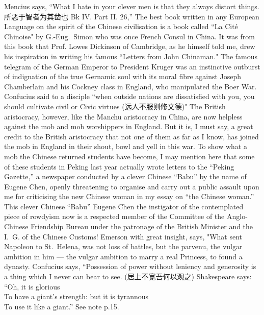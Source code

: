 
\begin{thebibliography}{30}
     Mencius says, ``What I hate in your clever men is that they always distort things. 所恶于智者为其凿也 Bk IV. Part II. 26,''
     The best book written in any European Language on the spirit of the Chinese civilisation is a book called ``La Cit\'e Chinoise" by G.-Eug.~Simon who was once French Consul in China. It was from this book that Prof. Lowes Dickinson of Cambridge, as he himself told me, drew his inspiration in writing his famous ``Letters from John Chinaman."
     The famous telegram of the German Emperor to President Kruger was an instinctive outburst of indignation of the true Gernamic soul with its moral fibre against Joseph Chamberlain and his Cockney class in England, who manipulated the Boer War.
     Confucius said to a disciple ``when outside nations are dissatisfied with you, you should cultivate civil or Civic virtues (远人不服则修文德)" The British aristocracy, however, like the Manchu aristocracy in China, are now helpless against the mob and mob worshippers in England. But it is, I must say, a great credit to the British aristocracy that not one of them as far as I know, has joined the mob in England in their shout, bowl and yell in this war.
     To show what a mob the Chinese returned students have become, I may mention here that some of these students in Peking last year actually wrote letters to the ``Peking Gazette,'' a newspaper conducted by a clever Chinese ``Babu'' by the name of Eugene Chen, openly threatening to organise and carry out a public assault upon me for criticising the new Chinese woman in my essay on ``the Chinese woman.'' This clever Chinese ``Babu'' Eugene Chen the instigator of the contemplated piece of rowdyism now is a respected member of the Committee of the Anglo-Chinese Friendship Bureau under the patronage of the British Minister and the I.~G. of the Chinese Customs!
     Emerson with great insight, says, "What sent Napoleon to St.~Helena, was not loss of battles, but the parvenu, the vulgar ambition in him --- the vulgar ambition to marry a real Princess, to found a dynasty.
     Confucius says, ``Possession of power without leniency and generosity is a thing which I never can bear to see. (居上不宽吾何以观之) Shakespeare says: \\``Oh, it is glorious\\ To have a giant's strength: but it is tyrannous \\ To use it like a giant.'' See note p.15.

\end{thebibliography}
